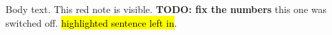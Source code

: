 \documentclass{article}
\newcommand{\rv}[1]{{\color{red}#1}}
\newcommand{\todoX}[1]{\textbf{\color{red}TODO: #1}}
\newcommand{\quokka}[1]{\textcolor{red}{#1}}
\renewcommand{\quokka}[1]{#1}
\begin{document}
Body text. \rv{This red note is visible.} \todoX{fix the numbers} \quokka{this one was switched off}.
\hl{highlighted sentence left in}.
 
\end{document}
